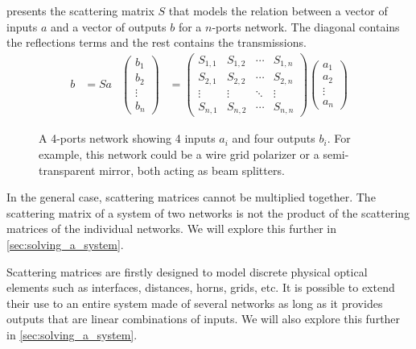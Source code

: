  presents the scattering matrix $S$ that models the relation between a vector of inputs $a$ and a vector of outputs $b$ for a $n$-ports network.
The diagonal contains the reflections terms and the rest contains the transmissions.
\begin{align}
    b &= S a
    &
    \begin{pmatrix}
        b_1\\
        b_2\\
        \vdots\\
        b_n
    \end{pmatrix}
    &=
    \begin{pmatrix}
        S_{1, 1} & S_{1, 2} & \cdots & S_{1, n} \\
        S_{2, 1} & S_{2, 2} & \cdots & S_{2, n} \\
        \vdots   & \vdots   & \ddots & \vdots   \\
        S_{n, 1} & S_{n, 2} & \cdots & S_{n, n}
    \end{pmatrix}
    \begin{pmatrix}
        a_1\\
        a_2\\
        \vdots\\
        a_n
    \end{pmatrix}
    \label{eq:scattering_matrix}
\end{align}

\begin{figure}[hbtp]
    \centering
    
    \caption{A 4-ports network showing 4 inputs $a_i$ and four outputs $b_i$.  For example, this network could be a wire grid polarizer or a semi-transparent mirror, both acting as beam splitters.}%
    \label{fig:scattering_matrix_notations}
\end{figure}

In the general case, scattering matrices cannot be multiplied together.
The scattering matrix of a system of two networks is not the product of the scattering matrices of the individual networks.
We will explore this further in \cref{sec:solving_a_system}.

Scattering matrices are firstly designed to model discrete physical optical elements such as interfaces, distances, horns, grids, etc.
It is possible to extend their use to an entire system made of several networks as long as it provides outputs that are linear combinations of inputs.
We will also explore this further in \cref{sec:solving_a_system}.

